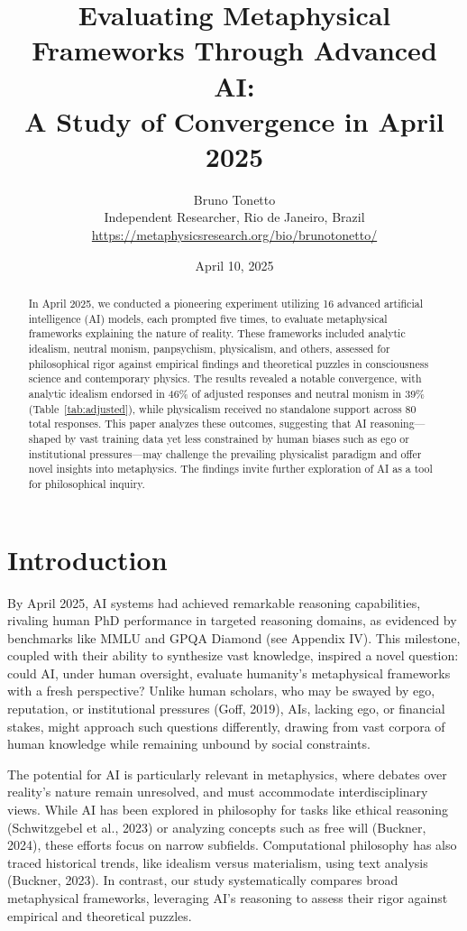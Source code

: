 \documentclass[11pt]{article}
\title{Evaluating Metaphysical Frameworks Through Advanced AI: \\ A Study of Convergence in April 2025}
\author{Bruno Tonetto\\
Independent Researcher, Rio de Janeiro, Brazil\\
\url{https://metaphysicsresearch.org/bio/brunotonetto/}}
\date{April 10, 2025}
\begin{document}
\maketitle

\begin{abstract}
In April 2025, we conducted a pioneering experiment utilizing 16 advanced artificial intelligence (AI) models, each prompted five times, to evaluate metaphysical frameworks explaining the nature of reality. These frameworks included analytic idealism, neutral monism, panpsychism, physicalism, and others, assessed for philosophical rigor against empirical findings and theoretical puzzles in consciousness science and contemporary physics. The results revealed a notable convergence, with analytic idealism endorsed in 46\% of adjusted responses and neutral monism in 39\% (Table~\ref{tab:adjusted}), while physicalism received no standalone support across 80 total responses. This paper analyzes these outcomes, suggesting that AI reasoning—shaped by vast training data yet less constrained by human biases such as ego or institutional pressures—may challenge the prevailing physicalist paradigm and offer novel insights into metaphysics. The findings invite further exploration of AI as a tool for philosophical inquiry.
\end{abstract}

\section{Introduction}
By April 2025, AI systems had achieved remarkable reasoning capabilities, rivaling human PhD performance in targeted reasoning domains, as evidenced by benchmarks like MMLU and GPQA Diamond (see Appendix IV). This milestone, coupled with their ability to synthesize vast knowledge, inspired a novel question: could AI, under human oversight, evaluate humanity’s metaphysical frameworks with a fresh perspective? Unlike human scholars, who may be swayed by ego, reputation, or institutional pressures (Goff, 2019), AIs, lacking ego, or financial stakes, might approach such questions differently, drawing from vast corpora of human knowledge while remaining unbound by social constraints.

The potential for AI is particularly relevant in metaphysics, where debates over reality’s nature remain unresolved, and must accommodate interdisciplinary views. While AI has been explored in philosophy for tasks like ethical reasoning (Schwitzgebel et al., 2023) or analyzing concepts such as free will (Buckner, 2024), these efforts focus on narrow subfields. Computational philosophy has also traced historical trends, like idealism versus materialism, using text analysis (Buckner, 2023). In contrast, our study systematically compares broad metaphysical frameworks, leveraging AI's reasoning to assess their rigor against empirical and theoretical puzzles.
\end{document}
